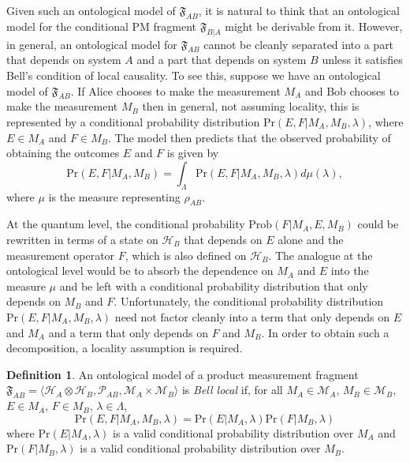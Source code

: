 \documentclass[DIV=calc,fontsize=12pt]{scrartcl} %
\theoremstyle{definition}
\newtheorem{definition}{Definition}[section]
\theoremstyle{plain}
\newcommand{\Hilb}[1][]{\ensuremath{\mathcal{H}_{#1}}}
\begin{document}
Given such an ontological model of $\mathfrak{F}_{AB}$, it is natural
to think that an ontological model for the conditional PM fragment
$\mathfrak{F}_{B|A}$ might be derivable from it.  However, in general,
an ontological model for $\mathfrak{F}_{AB}$ cannot be cleanly
separated into a part that depends on system $A$ and a part that
depends on system $B$ unless it satisfies Bell's condition of local
causality.  To see this, suppose we have an ontological model of
$\mathfrak{F}_{AB}$.  If Alice chooses to make the measurement $M_A$
and Bob chooses to make the measurement $M_B$ then in general, not
assuming locality, this is represented by a conditional probability
distribution $\text{Pr}(E, F|M_A,M_B,\lambda)$, where $E \in M_A$
and $F \in M_B$.  The model then predicts that the observed
probability of obtaining the outcomes $E$ and $F$ is given by
\begin{equation}
\text{Pr}(E,F|M_A,M_B) = \int_{\Lambda}
\text{Pr}(E,F|M_A,M_B,\lambda) d\mu(\lambda), \label{eq:Bell:ontjoint}
\end{equation}
where $\mu$ is the measure representing $\rho_{AB}$.

At the quantum level, the conditional probability
$\text{Prob}(F|M_A,E,M_B)$ could be rewritten in terms of a state on
$\Hilb[B]$ that depends on $E$ alone and the measurement operator $F$,
which is also defined on $\Hilb[B]$.  The analogue at the ontological
level would be to absorb the dependence on $M_A$ and $E$ into the
measure $\mu$ and be left with a conditional probability distribution
that only depends on $M_B$ and $F$.  Unfortunately, the conditional
probability distribution $\text{Pr}(E, F | M_A,M_B,\lambda)$ need not
factor cleanly into a term that only depends on $E$ and $M_A$ and a
term that only depends on $F$ and $M_B$.  In order to obtain such a
decomposition, a locality assumption is required.

\begin{definition}
An ontological model of a product measurement fragment
$\mathfrak{F}_{AB} = \langle \Hilb[A] \otimes \Hilb[B],
\mathcal{P}_{AB}, \mathcal{M}_A \times \mathcal{M}_B \rangle$ is
\emph{Bell local} if, for all $M_A \in \mathcal{M}_A$, $M_B \in
\mathcal{M}_B$, $E \in M_A$, $F \in M_B$, $\lambda \in \Lambda$,
\begin{equation}
\label{eq:Bell:local}
\text{Pr}(E,F|M_A,M_B,\lambda) =
\text{Pr}(E|M_A,\lambda)\text{Pr}(F|M_B,\lambda)
\end{equation}
where $\text{Pr}(E|M_A,\lambda)$ is a valid conditional
probability distribution over $M_A$ and $\text{Pr}(F|M_B,\lambda)$
is a valid conditional probability distribution over $M_B$.
\end{definition}
\end{document}
